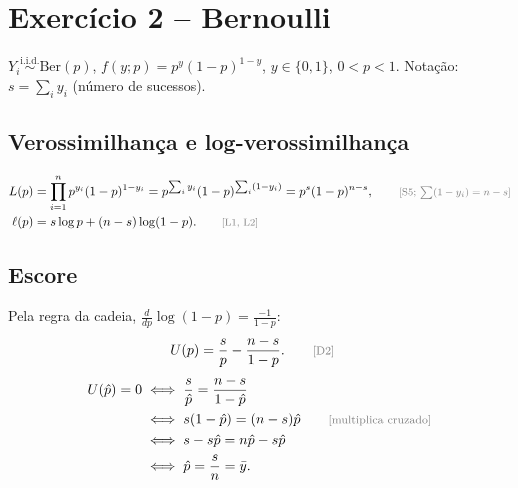 \documentclass[11pt,a4paper]{article}
\newcommand{\iid}{\overset{\text{i.i.d.}}{\sim}}
\newcommand{\just}[1]{\tag*{\footnotesize\textcolor{gray}{[#1]}}}
\theoremstyle{definition}
\theoremstyle{plain}
\begin{document}
\section{Exercício 2 -- Bernoulli}

$Y_i\iid\text{Ber}(p)$, $f(y;p)=p^y(1-p)^{1-y}$, $y\in\{0,1\}$, $0<p<1$. Notação: $s=\sum_iy_i$ (número de sucessos).

\subsection*{Verossimilhança e log-verossimilhança}
\begin{align*}
L(p)&=\prod_{i=1}^np^{y_i}(1-p)^{1-y_i}=p^{\sum_iy_i}(1-p)^{\sum_i(1-y_i)}=p^{s}(1-p)^{n-s}, \just{S5; $\sum(1-y_i)=n-s$}\\
\ell(p)&=s\log p+(n-s)\log(1-p). \just{L1, L2}
\end{align*}

\subsection*{Escore}
Pela regra da cadeia, $\frac{d}{dp}\log(1-p)=\frac{-1}{1-p}$:
\begin{align*}
U(p)&=\frac{s}{p}-\frac{n-s}{1-p}. \just{D2}
\end{align*}
\begin{align*}
U(\hat p)=0&\iff\frac{s}{\hat p}=\frac{n-s}{1-\hat p}\\
&\iff s(1-\hat p)=(n-s)\hat p \just{multiplica cruzado}\\
&\iff s-s\hat p=n\hat p-s\hat p\\
&\iff\hat p=\frac sn=\bar y .
\end{align*}
\end{document}
